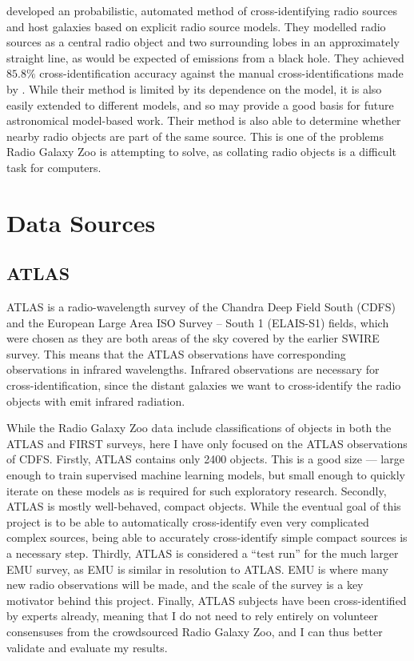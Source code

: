 \documentclass[a4paper]{article}
\begin{document}
      \citet{fan15} developed an probabilistic, automated method of cross-identifying radio sources and host galaxies based on explicit radio source models. They modelled radio sources as a central radio object and two surrounding lobes in an approximately straight line, as would be expected of emissions from a black hole. They achieved $85.8\%$ cross-identification accuracy against the manual cross-identifications made by \citet{norris06}. While their method is limited by its dependence on the model, it is also easily extended to different models, and so may provide a good basis for future astronomical model-based work. Their method is also able to determine whether nearby radio objects are part of the same source. This is one of the problems Radio Galaxy Zoo is attempting to solve, as collating radio objects is a difficult task for computers.

  \section{Data Sources}

    \subsection{ATLAS}

      ATLAS is a radio-wavelength survey of the Chandra Deep Field South (CDFS) and the European Large Area ISO Survey -- South 1 (ELAIS-S1) fields, which were chosen as they are both areas of the sky covered by the earlier SWIRE survey. This means that the ATLAS observations have corresponding observations in infrared wavelengths\cite{franzen15}. Infrared observations are necessary for cross-identification, since the distant galaxies we want to cross-identify the radio objects with emit infrared radiation.

      While the Radio Galaxy Zoo data include classifications of objects in both the ATLAS and FIRST surveys, here I have only focused on the ATLAS observations of CDFS. Firstly, ATLAS contains only 2400 objects. This is a good size --- large enough to train supervised machine learning models, but small enough to quickly iterate on these models as is required for such exploratory research. Secondly, ATLAS is mostly well-behaved, compact objects. While the eventual goal of this project is to be able to automatically cross-identify even very complicated complex sources, being able to accurately cross-identify simple compact sources is a necessary step. Thirdly, ATLAS is considered a ``test run'' for the much larger EMU survey, as EMU is similar in resolution to ATLAS\cite{franzen15}. EMU is where many new radio observations will be made, and the scale of the survey is a key motivator behind this project. Finally, ATLAS subjects have been cross-identified by experts already\cite{norris06}, meaning that I do not need to rely entirely on volunteer consensuses from the crowdsourced Radio Galaxy Zoo, and I can thus better validate and evaluate my results.
\end{document}

